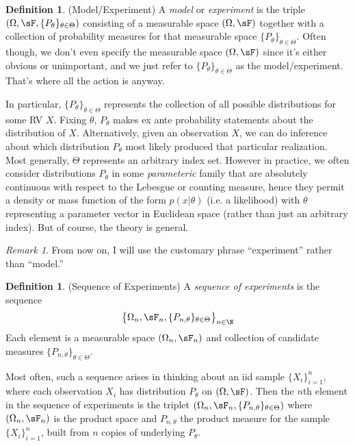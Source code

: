 \documentclass[12pt]{article}
\theoremstyle{plain}
\theoremstyle{definition}
\newtheorem{defn}[thm]{Definition}
\theoremstyle{remark}
\newtheorem*{rmk}{Remark}
\begin{document}
\begin{defn}(Model/Experiment)
A \emph{model} or \emph{experiment} is the triple
$(\Omega,\sF,\{P_\theta\}_{\theta\in  \Theta})$ consisting of a measurable space
$(\Omega,\sF)$ together with a collection of probability measures for
that measurable space $\{P_\theta\}_{\theta\in  \Theta}$.
Often though, we don't even specify the measurable space $(\Omega,\sF)$
since it's either obvious or unimportant, and we just refer to
$\{P_\theta\}_{\theta\in  \Theta}$ as the model/experiment. That's where
all the action is anyway.

In particular, $\{P_\theta\}_{\theta\in  \Theta}$ represents the collection of all
possible distributions for some RV $X$.
Fixing $\theta$, $P_\theta$ makes ex ante probability statements about
the distribution of $X$. Alternatively, given an observation $X$, we can
do inference about which distribution $P_\theta$ most likely produced
that particular realization.
Most generally, $ \Theta$ represents an arbitrary index set.
However in practice, we often consider distributions $P_\theta$ in some
\emph{parameteric} family that are absolutely continuous with respect to
the Lebesgue or counting measure, hence they permit a density or mass
function of the form $p(x|\theta)$ (i.e. a likelihood) with $\theta$
representing a parameter vector in Euclidean space (rather than just an
arbitrary index). But of course, the theory is general.
\end{defn}
\begin{rmk}
From now on, I will use the customary phrase ``experiment'' rather than
``model.''
\end{rmk}

\begin{defn}(Sequence of Experiments)
\label{defn:seqexp}
A \emph{sequence of experiments} is the sequence
\begin{align*}
  \big\{\Omega_n,\sF_n,\{P_{n,\theta}\}_{\theta\in  \Theta}
  \big\}_{n\in \N}
\end{align*}
Each element is a measurable space $(\Omega_n,\sF_n)$ and
collection of candidate measures $\{P_{n,\theta}\}_{\theta\in  \Theta}$.

Most often, such a sequence arises in thinking about an iid sample
$\{X_i\}_{i=1}^n$, where each observation $X_i$ has distribution $P_\theta$
on $(\Omega,\sF)$.
Then the $n$th element in the sequence of experiments is the
triplet $(\Omega_n,\sF_n,\{P_{n,\theta}\}_{\theta\in  \Theta})$ where
$(\Omega_n,\sF_n)$ is the product space and $P_{n,\theta}$ the product
measure for the sample $\{X_i\}_{i=1}^n$, built from $n$ copies of
underlying $P_\theta$.
\end{defn}
\end{document}
